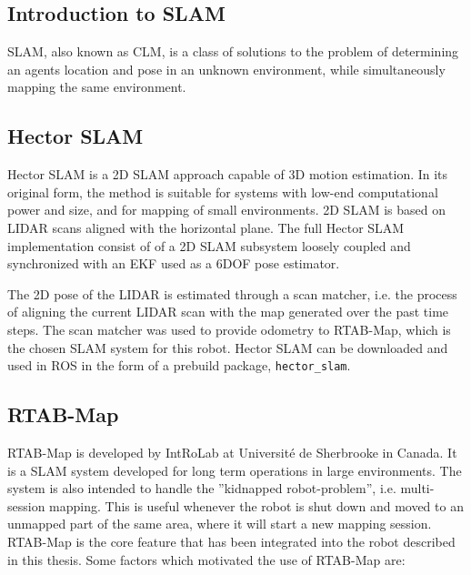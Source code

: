 \subsection{Introduction to SLAM}

\ac{SLAM}, also known as \ac{CLM}, is a class of solutions to the problem of determining an agents location and pose in an unknown environment, while simultaneously mapping the same environment.

\subsection{Hector SLAM}
\label{sec:hector}
Hector SLAM \cite{KohlbrecherMeyerStrykKlingaufFlexibleSlamSystem2011} is a 2D \ac{SLAM} approach capable of 3D motion estimation. In its original form, the method is suitable for systems with low-end computational power and size, and for mapping of small environments. 2D \ac{SLAM} is based on \ac{LIDAR} scans aligned with the horizontal plane. The full Hector SLAM implementation consist of of a 2D \ac{SLAM} subsystem loosely coupled and synchronized with an \ac{EKF} used as a  6DOF pose estimator. 

The 2D pose of the \ac{LIDAR} is estimated through a scan matcher, i.e. the process of aligning the current \ac{LIDAR} scan with the map generated over the past time steps. The scan matcher was used to provide odometry to \ac{RTAB-Map}, which is the chosen \ac{SLAM} system for this robot. Hector SLAM can be downloaded and used in \ac{ROS} in the form of a prebuild package, \texttt{hector\_slam}.  

\subsection{RTAB-Map}
\label{sec:RTAB-Map}

\ac{RTAB-Map} is developed by IntRoLab at Université de Sherbrooke in Canada. It is a \ac{SLAM} system developed for long term operations in large environments. The system is also intended to handle the ''kidnapped robot-problem'', i.e. multi-session mapping. This is useful whenever the robot is shut down and moved to an unmapped part of the same area, where it will start a new mapping session. \ac{RTAB-Map} is the core feature that has been integrated into the robot described in this thesis. Some factors which motivated the use of \ac{RTAB-Map} are:


